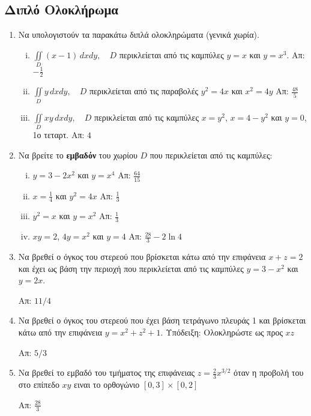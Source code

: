\subsection*{Διπλό Ολοκλήρωμα}

\begin{enumerate}
  \item Να υπολογιστούν τα παρακάτω διπλά ολοκληρώματα (γενικά χωρία).
    \begin{enumerate}[i)]
      \item $\iint\limits_{D}(x-1)\,dxdy,\quad D$ περικλείεται από τις καμπύλες 
        $y=x$ και $y=x^3$. %
        \hfill Απ: $-\frac{1}{2}$
      \item $ \iint\limits_{D} y\,dxdy, \quad D $ περικλείεται από τις παραβολές 
        $ y^2=4x $ και $ x^{2}=4y $ 
        \hfill Απ: $ \frac{48}{5} $ %
      \item $ \iint\limits_{D} xy\,dxdy, \quad D $ περικλείεται από τις καμπύλες 
        $ x=y^{2} $, $ x=4-y^{2} $ και $ y=0 $, 1ο τεταρτ.
        \hfill Απ: $4$ %

    \end{enumerate}

  \item Να βρείτε το \textbf{εμβαδόν} του χωρίου $D$ που περικλείεται από τις καμπύλες: 
    \begin{enumerate}[i)]
      \item $y=3-2x^2$ και $y=x^4$ \hfill Απ: $\frac{64}{15}$
      \item $x=\frac{1}{4}$ και $y^2=4x$ \hfill Απ: $\frac{1}{3}$ %
      \item $y^2=x$ και $y=x^2$ \hfill Απ: $\frac{1}{3}$ %
      \item $xy=2$, $4y=x^2$ και $y=4$ \hfill Απ: $\frac{28}{3}-2\ln 4$ 
    \end{enumerate}

  \item Να βρεθεί ο όγκος του στερεού που βρίσκεται κάτω από την επιφάνεια 
    $ x+z=2 $ και έχει ως βάση την περιοχή που περικλείεται από τις καμπύλες 
    $ y=3-x^{2} $ και $ y=2x $. 

    \hfill Απ: $ 11/4 $ 

  \item Να βρεθεί ο όγκος του στερεού που έχει βάση τετράγωνο πλευράς 1 και βρίσκεται
    κάτω από την επιφάνεια $ y=x^{2}+z^{2}+1 $. 
    \textcolor{Col1}{Υπόδειξη:} Ολοκληρώστε ως προς $ xz $

    \hfill Απ: $5/3$ 

  \item Να βρεθεί το εμβαδό του τμήματος της επιφάνειας $ z= \frac{2}{3} x^{3/2} $ 
    όταν η προβολή του στο επίπεδο $ xy $ ειναι το ορθογώνιο $ [0,3] \times [0,2] $ 

    \hfill Απ: $ \frac{28}{ 3} $ 
\end{enumerate}

 


